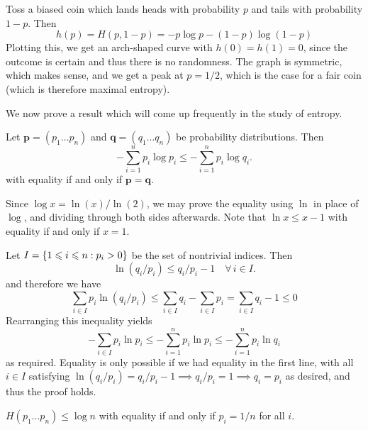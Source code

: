 \documentclass{article}
\begin{document}
\begin{example}
	\label{entropy-of-single-variable}
    Toss a biased coin
    which lands heads with probability $p$
    and tails with probability $1-p$.
    Then
    \[
	h(p) = H(p, 1-p) = -p \log p - (1-p) \log (1-p)
	\]
	Plotting this, we get an arch-shaped curve with $h(0) = h(1) = 0$,
	since the outcome is certain and thus there is no randomness.
	The graph is symmetric, which makes sense,
	and we get a peak at $p = 1/2$,
	which is the case for a fair coin
	(which is therefore maximal entropy).
\end{example}

We now prove a result which will come up frequently in the study of entropy.

\begin{theorem}
	\label{gibbs-inequality}
    Let $\mathbf p = (p_1 \dots p_n)$
    and $\mathbf q = (q_1 \dots q_n)$
    be probability distributions. Then
    \[
	- \sum_{i=1}^n p_i \log p_i \leq
	- \sum_{i=1}^n p_i \log q_i.
	\]
	with equality if and only if $\mathbf p = \mathbf q$.
\end{theorem}

\begin{prf}
    Since $\log x = \ln (x) / \ln (2)$,
    we may prove the equality using $\ln$ in place of $\log$,
    and dividing through both sides afterwards.
    Note that $\ln x \leq x-1$ with equality if and only if $x=1$.
    
    Let $I = \left\lbrace 1 \leqslant i \leqslant n: p_i > 0 \right\rbrace$
    be the set of nontrivial indices. Then
    \[
	\ln(q_i/p_i) \leq
	q_i / p_i - 1
	\quad \forall \, i \in I.
	\]
	and therefore we have
	\[
	\sum_{i \in I} p_i \ln (q_i / p_i) \leq
	\sum_{i \in I} q_i - \sum_{i \in I} p_i =
	\sum_{i \in I} q_i - 1 \leq 0
	\]
	Rearranging this inequality yields
	\[
	- \sum_{i \in I} p_i \ln p_i \leq
	- \sum_{i=1}^n p_i \ln p_i \leq
	- \sum_{i=1}^n p_i \ln q_i
	\]
	as required.
	Equality is only possible if we had equality in the first line,
	with all $i \in I$ satisfying
	$\ln(q_i/p_i) = q_i / p_i - 1 \implies q_i / p_i = 1 \implies q_i = p_i$
	as desired, and thus the proof holds.
\end{prf}

\begin{corollary}
    $H(p_1 \dots p_n) \leq \log n$
    with equality if and only if
    $p_i = 1/n$ for all $i$.
\end{corollary}

\end{document}
